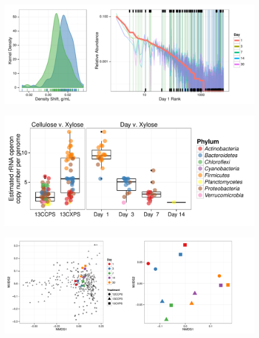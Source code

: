 \begin{figure}[H]
	\begin{center}
	\centerline{\includegraphics[width=\textwidth]{figures/shift_and_rabund1/shift_and_rabund1.pdf}}

	\caption{\protect}\label{fig:shift}
        \end{center}
\end{figure}

\begin{figure}[H]
	\begin{center}
	\centerline{\includegraphics[width=\textwidth]{figures/copy_number/copy_number.pdf}}
	\caption{\protect}\label{fig:copy}
        \end{center}
\end{figure}

\begin{figure}[H]
	\begin{center}
		\centerline{\includegraphics[width=\textwidth]{figures/bulk_ordination/bulk_ordination.pdf}}
	\caption{\protect}\label{fig:bulk_ord}
        \end{center}
\end{figure}

